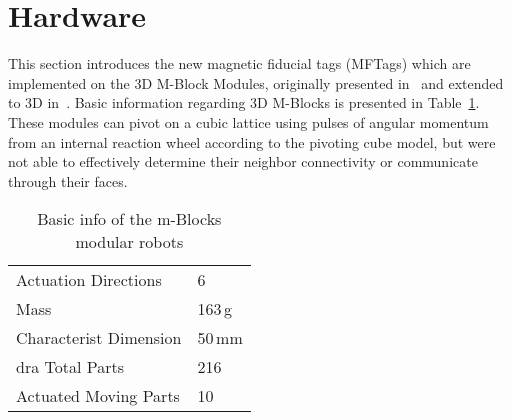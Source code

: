\section{Hardware}
\label{sec:Hardware}

This section introduces the new magnetic fiducial tags (MFTags) which are implemented on the 3D M-Block Modules, originally presented in~\cite{RomanishinRus-IROS13} and extended to 3D in~\cite{Romanishin20153d}. Basic information regarding 3D M-Blocks is presented in Table~\ref{tab:hardwareOverviewTable}. These modules can pivot on a cubic lattice using pulses of angular momentum from an internal reaction wheel according to the pivoting cube model, but were not able to effectively determine their neighbor connectivity or communicate through their faces. 
\begin{table}[h]
	\caption{Basic info of the m-Blocks modular robots}
	
	\begin{tabular}{ p{3.4cm}  p{1.9cm} }
		\hline
		Actuation Directions & 6 \\
		Mass  & 163\,g \\
		Characterist Dimension & 50\,mm \\dra
		Total Parts  & 216 \\
		Actuated Moving Parts  & 10 \\
	\end{tabular}
	
	\label{tab:hardwareOverviewTable}
\end{table}

